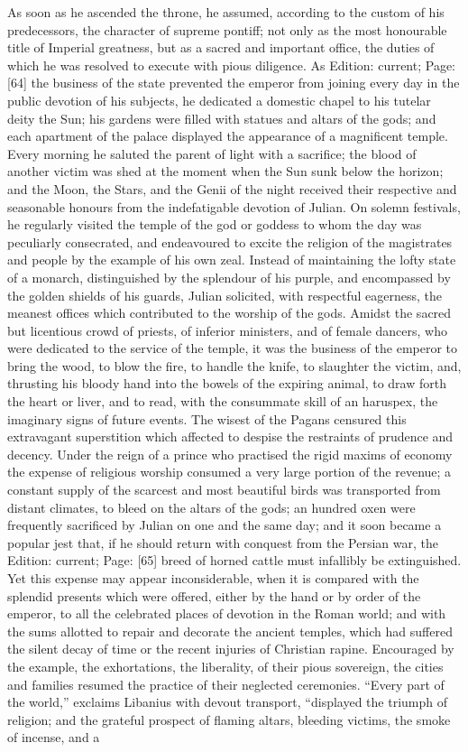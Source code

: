 As soon as he ascended the throne, he assumed, according to the custom of his predecessors, the character of supreme pontiff; not only as the most honourable title of Imperial greatness, but as a sacred and important office, the duties of which he was resolved to execute with pious diligence. As Edition: current; Page: [64] the business of the state prevented the emperor from joining every day in the public devotion of his subjects, he dedicated a domestic chapel to his tutelar deity the Sun; his gardens were filled with statues and altars of the gods; and each apartment of the palace displayed the appearance of a magnificent temple. Every morning he saluted the parent of light with a sacrifice; the blood of another victim was shed at the moment when the Sun sunk below the horizon; and the Moon, the Stars, and the Genii of the night received their respective and seasonable honours from the indefatigable devotion of Julian. On solemn festivals, he regularly visited the temple of the god or goddess to whom the day was peculiarly consecrated, and endeavoured to excite the religion of the magistrates and people by the example of his own zeal. Instead of maintaining the lofty state of a monarch, distinguished by the splendour of his purple, and encompassed by the golden shields of his guards, Julian solicited, with respectful eagerness, the meanest offices which contributed to the worship of the gods. Amidst the sacred but licentious crowd of priests, of inferior ministers, and of female dancers, who were dedicated to the service of the temple, it was the business of the emperor to bring the wood, to blow the fire, to handle the knife, to slaughter the victim, and, thrusting his bloody hand into the bowels of the expiring animal, to draw forth the heart or liver, and to read, with the consummate skill of an haruspex, the imaginary signs of future events. The wisest of the Pagans censured this extravagant superstition which affected to despise the restraints of prudence and decency. Under the reign of a prince who practised the rigid maxims of economy the expense of religious worship consumed a very large portion of the revenue; a constant supply of the scarcest and most beautiful birds was transported from distant climates, to bleed on the altars of the gods; an hundred oxen were frequently sacrificed by Julian on one and the same day; and it soon became a popular jest that, if he should return with conquest from the Persian war, the Edition: current; Page: [65] breed of horned cattle must infallibly be extinguished. Yet this expense may appear inconsiderable, when it is compared with the splendid presents which were offered, either by the hand or by order of the emperor, to all the celebrated places of devotion in the Roman world; and with the sums allotted to repair and decorate the ancient temples, which had suffered the silent decay of time or the recent injuries of Christian rapine. Encouraged by the example, the exhortations, the liberality, of their pious sovereign, the cities and families resumed the practice of their neglected ceremonies. \texthebrew{“}Every part of the world,\texthebrew{}” exclaims Libanius with devout transport, \texthebrew{“}displayed the triumph of religion; and the grateful prospect of flaming altars, bleeding victims, the smoke of incense, and a 